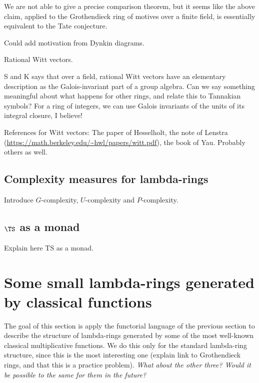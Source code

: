 \documentclass[a4paper]{article}
\begin{document}
\begin{example}
We are not able to give a precise comparison theorem, but it seems like the above claim, applied to the Grothendieck ring of motives over a finite field, is essentially equivalent to the Tate conjecture.
\end{example}

\begin{example}
Could add motivation from Dynkin diagrams.
\end{example}

\begin{example}
Rational Witt vectors.
\end{example}

S and K says that over a field, rational Witt vectors have an elementary description as the Galois-invariant part of a group algebra. Can we say something meaningful about what happens for other rings, and relate this to Tannakian symbols? For a ring of integers, we can use Galois invariants of the units of its integral closure, I believe!

References for Witt vectors:
The paper of Hesselholt, the note of Lenstra (\url{https://math.berkeley.edu/~hwl/papers/witt.pdf}), the book of Yau. Probably others as well.

\subsection{Complexity measures for lambda-rings}

Introduce $G$-complexity, $U$-complexity and $P$-complexity.



\subsection{$\TS$ as a monad}

Explain here TS as a monad.

\section{Some small lambda-rings generated by classical functions}

The goal of this section is apply the functorial language of the previous section to describe the structure of lambda-rings generated by some of the most well-known classical multiplicative functions. We do this only for the standard lambda-ring structure, since this is the most interesting one (explain link to Grothendieck rings, and that this is a practice problem). \emph{What about the other three? Would it be possible to the same for them in the future?}
\end{document}
